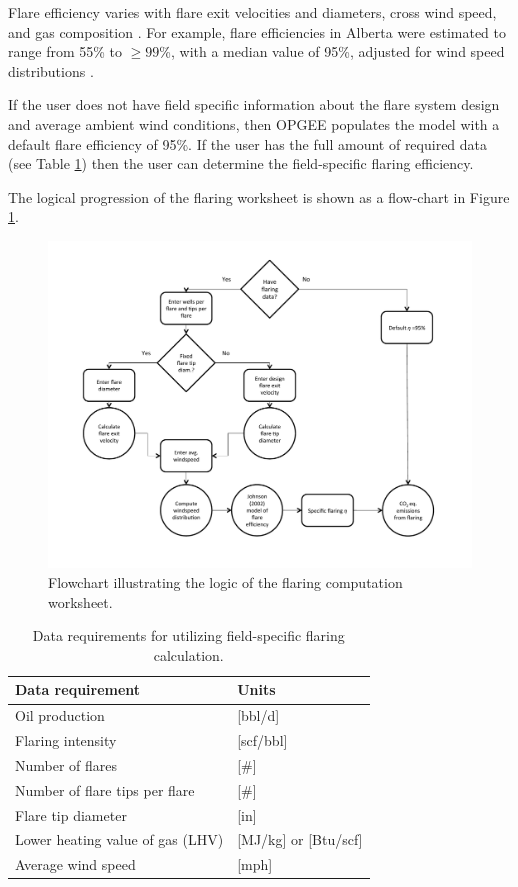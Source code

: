 \documentclass[11pt]{report}
\begin{document}
Flare efficiency varies with flare exit velocities and diameters, cross wind speed, and gas composition \cite{Johnson2001, Johnson2008}. For example, flare efficiencies in Alberta were estimated to range from 55\% to $\geq 99$\%, with a median value of 95\%, adjusted for wind speed distributions \cite{Johnson2008}. 

If the user does not have field specific information about the flare system design and average ambient wind conditions, then OPGEE populates the model with a default flare efficiency of 95\%. If the user has the full amount of required data (see Table \ref{tab:flaring_data_reqs}) then the user can determine the field-specific flaring efficiency.

The logical progression of the flaring worksheet is shown as a flow-chart in Figure \ref{fig:flaring_logic}.

\begin{figure}[t]
\includegraphics[width=1\columnwidth]{images/Flaring_logic.pdf}
\caption{Flowchart illustrating the logic of the flaring computation worksheet.}
\label{fig:flaring_logic}
\end{figure}

\begin{table}
\begin{scriptsize}
\caption{Data requirements for utilizing field-specific flaring calculation.}
\label{tab:flaring_data_reqs}
\begin{tabular*}{1\columnwidth}{p{}p{}}
\toprule
Data requirement & Units \\
\midrule
Oil production & [bbl/d]\\
Flaring intensity & [scf/bbl] \\
Number of flares & [\#]\\
Number of flare tips per flare & [\#]\\
Flare tip diameter & [in]\\
Lower heating value of gas (LHV) & [MJ/kg] or [Btu/scf]\\
Average wind speed & [mph]\\
\bottomrule
\end{tabular*}
\end{scriptsize}
\end{table}
\end{document}

